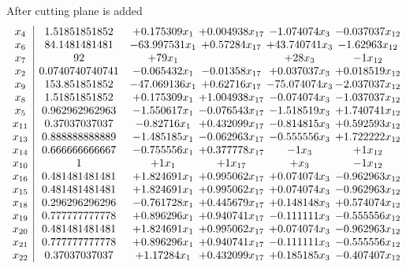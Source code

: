 \documentclass[11pt]{article}
\begin{document}
 After cutting plane is added 
\[\begin{array}{c| c c@{\hskip 2pt} c@{\hskip 2pt} c@{\hskip 2pt} c@{\hskip 2pt} }
 x_{4}   &  1.51851851852 & + 0.175309 x_{1} & + 0.004938 x_{17} & -1.074074 x_{3} & -0.037037 x_{12}\\
 x_{6}   &  84.1481481481 & -63.997531 x_{1} & + 0.57284 x_{17} & + 43.740741 x_{3} & -1.62963 x_{12}\\
 x_{7}   &  92 & + 79 x_{1} &   & + 28 x_{3} & -1 x_{12}\\
 x_{2}   &  0.0740740740741 & -0.065432 x_{1} & -0.01358 x_{17} & + 0.037037 x_{3} & + 0.018519 x_{12}\\
 x_{9}   &  153.851851852 & -47.069136 x_{1} & + 0.62716 x_{17} & -75.074074 x_{3} & -2.037037 x_{12}\\
 x_{8}   &  1.51851851852 & + 0.175309 x_{1} & + 1.004938 x_{17} & -0.074074 x_{3} & -1.037037 x_{12}\\
 x_{5}   &  0.962962962963 & -1.550617 x_{1} & -0.076543 x_{17} & -1.518519 x_{3} & + 1.740741 x_{12}\\
 x_{11}   &  0.37037037037 & -0.82716 x_{1} & + 0.432099 x_{17} & -0.814815 x_{3} & + 0.592593 x_{12}\\
 x_{13}   &  0.888888888889 & -1.485185 x_{1} & -0.062963 x_{17} & -0.555556 x_{3} & + 1.722222 x_{12}\\
 x_{14}   &  0.666666666667 & -0.755556 x_{1} & + 0.377778 x_{17} & -1 x_{3} & + 1 x_{12}\\
 x_{10}   &  1 & + 1 x_{1} & + 1 x_{17} & +  x_{3} & -1 x_{12}\\
 x_{16}   &  0.481481481481 & + 1.824691 x_{1} & + 0.995062 x_{17} & + 0.074074 x_{3} & -0.962963 x_{12}\\
 x_{15}   &  0.481481481481 & + 1.824691 x_{1} & + 0.995062 x_{17} & + 0.074074 x_{3} & -0.962963 x_{12}\\
 x_{18}   &  0.296296296296 & -0.761728 x_{1} & + 0.445679 x_{17} & + 0.148148 x_{3} & + 0.574074 x_{12}\\
 x_{19}   &  0.777777777778 & + 0.896296 x_{1} & + 0.940741 x_{17} & -0.111111 x_{3} & -0.555556 x_{12}\\
 x_{20}   &  0.481481481481 & + 1.824691 x_{1} & + 0.995062 x_{17} & + 0.074074 x_{3} & -0.962963 x_{12}\\
 x_{21}   &  0.777777777778 & + 0.896296 x_{1} & + 0.940741 x_{17} & -0.111111 x_{3} & -0.555556 x_{12}\\
 x_{22}   &  0.37037037037 & + 1.17284 x_{1} & + 0.432099 x_{17} & + 0.185185 x_{3} & -0.407407 x_{12}\\

\end{array}\]
\end{document}
